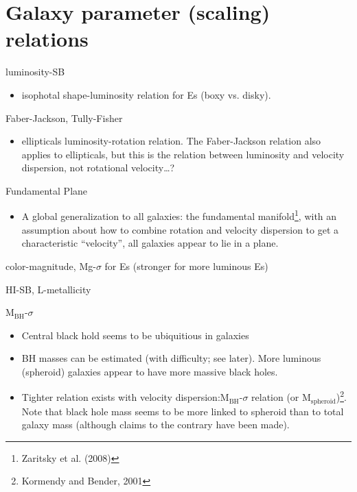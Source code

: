 \documentclass{article}
\newcommand{\mynotes}[1]{\textcolor{cadmiumgreen}{#1}}
\begin{document}
\section{Galaxy parameter (scaling) relations}
\begin{description}[labelindent=0.2in]
    \item [Structural] luminosity-SB
        \begin{itemize}
            \item isophotal shape-luminosity relation for Es
                (boxy vs. disky).
        \end{itemize}
    \item [Kinematic] Faber-Jackson, Tully-Fisher
        \begin{itemize}
            \item ellipticals luminosity-rotation relation.
                \mynotes{The Faber-Jackson relation also applies to
                ellipticals, but this is the relation between luminosity
                and velocity dispersion, not rotational velocity\ldots?}
        \end{itemize}
    \item [Structural/kinematic] Fundamental Plane
        \begin{itemize}
            \item A global generalization to all galaxies: the fundamental
                manifold\footnote{Zaritsky et al. (2008)}, with an
                assumption about how to combine rotation and velocity
                dispersion to get a characteristic ``velocity'', all galaxies
                appear to lie in a plane.
        \end{itemize}
    \item [Stellar populations] color-magnitude, Mg-$\sigma$ for Es
        (stronger for more luminous Es)
    \item [Gas] HI-SB, L-metallicity
    \item [Black holes] M$_{\mathrm{BH}}$-$\sigma$
        \begin{itemize}
            \item Central black hold seems to be ubiquitious in galaxies
            \item BH masses can be estimated (with difficulty; see later).
                More luminous (spheroid) galaxies appear to have more
                massive black holes.
            \item Tighter relation exists with velocity
                dispersion:M$_{\mathrm{BH}}$-$\sigma$ relation
                (or M$_{\mathrm{spheroid}}$)\footnote{Kormendy and
                Bender, 2001}. Note that black hole mass seems to be
                more linked to spheroid than to total galaxy mass
                (although claims to the contrary have been made).
        \end{itemize}
\end{description}
\end{document}
